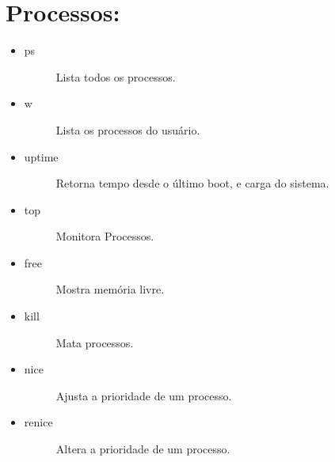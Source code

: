\documentclass[a4paper,10pt,brazil]{sphinxmanual}
\begin{document}
\section{Processos:}
\label{unix:processos}\begin{itemize}
\item {} \begin{description}
\item[{ps}] \leavevmode
Lista todos os processos.

\end{description}

\item {} \begin{description}
\item[{w}] \leavevmode
Lista os processos do usuário.

\end{description}

\item {} \begin{description}
\item[{uptime}] \leavevmode
Retorna tempo desde o último boot, e carga do sistema.

\end{description}

\item {} \begin{description}
\item[{top}] \leavevmode
Monitora Processos.

\end{description}

\item {} \begin{description}
\item[{free}] \leavevmode
Mostra memória livre.

\end{description}

\item {} \begin{description}
\item[{kill}] \leavevmode
Mata processos.

\end{description}

\item {} \begin{description}
\item[{nice}] \leavevmode
Ajusta a prioridade de um processo.

\end{description}

\item {} \begin{description}
\item[{renice}] \leavevmode
Altera a prioridade de um processo.

\end{description}

\end{itemize}
\end{document}
